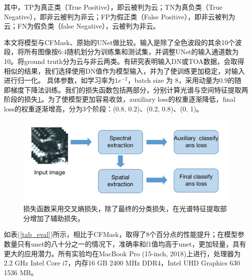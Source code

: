 \documentclass[UTF8]{ctexart}
\begin{document}
其中，TP为真正类（True Positive），即云被判为云；TN为真负类（True Negative），即非云被判为非云；FP为假正类（False Positive），即非云被判为云；FN为假负类（false Negative），云被判为非云。

本文将模型与CFMask、原始的UNet做比较。输入是除了全色波段的其余10个波段，将所有图像按6:4随机划分为训练集和测试集，并调整UNet的输入通道数为10。将ground truth分为云与非云两类。有研究表明\cite{chai2019cloud}输入DN或TOA数据，会取得相似的结果，我们选择使用DN值作为模型输入，并为了使训练更加稳定，对输入进行归一化。
具体参数，如学习率为$1e^{-2}$，batch size 为 8，采用动量为0.9的随即梯度下降法训练。我们的损失函数包括两部分，分别计算光谱与空间特征提取两阶段的损失\ref{pic:loss}。为了使模型更加容易收敛，auxiliary loss的权重逐渐降低，final loss的权重逐渐增高，分为3个阶段：(0.8, 0.2)、(0.2, 0.8)、(0, 1)。

\begin{figure}[H]
    \centering
    \includegraphics[scale=0.25]{../pic/loss.jpg}
    \caption[]{损失函数采用交叉熵损失，除了最终的分类损失，在光谱特征提取部分增加了辅助损失。}
    \label{pic:loss}
\end{figure}

如表(\ref{tab_eval})所示，相比于CFMask，取得了8个百分点的性能提升；在模型参数量只有unet的八十分之一的情况下，准确率和f1值均高于unet，更加轻量，具有更大的应用潜力。所有实验均在MacBook Pro (15-inch, 2018)上进行，处理器为2.2 GHz Intel Core i7，内存16 GB 2400 MHz DDR4，Intel UHD Graphics 630 1536 MB。
\end{document}
